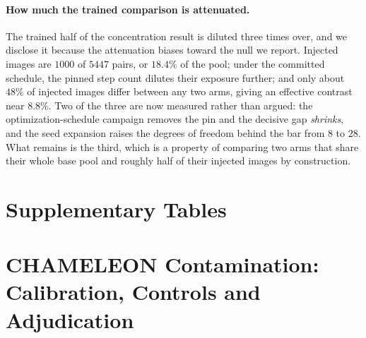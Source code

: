 \documentclass{article}
\begin{document}
\paragraph{How much the trained comparison is attenuated.} The trained half of the concentration
result is diluted three times over, and we disclose it because the attenuation biases toward the
null we report. Injected images are $1000$ of $5447$ pairs, or $18.4\%$ of the pool; under the
committed schedule, the pinned step count dilutes their exposure further; and only about $48\%$ of
injected images differ between any two arms, giving an effective contrast near $8.8\%$. Two of the
three are now measured rather than argued: the optimization-schedule campaign removes the pin and
the decisive gap \emph{shrinks}, and the seed expansion raises the degrees of freedom behind the
bar from $8$ to $28$. What remains is the third, which is a property of comparing two arms that
share their whole base pool and roughly half of their injected images by construction.

\section{Supplementary Tables}
\label{app:tables}





\clearpage


\section{CHAMELEON Contamination: Calibration, Controls and Adjudication}
\label{app:chamext}
\end{document}
